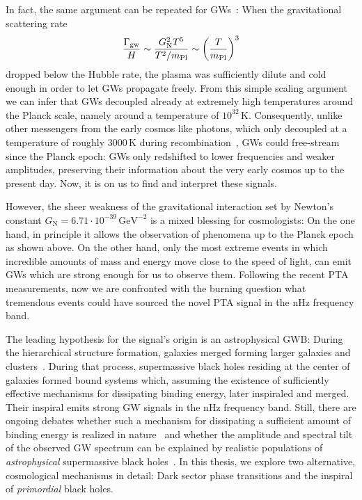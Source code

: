 In fact, the same argument can be repeated for \acp{GW}~\cite{Caprini:2018mtu, Maggiore:2007ulw}: When the gravitational scattering rate 
\begin{align}
	\frac{\Gamma_\text{gw}}{H} \sim \frac{G_\text{N}^2 T^5}{T^2 / m_\text{Pl}} \sim \left( \frac{T}{m_\text{Pl}} \right)^3
\end{align}
dropped below the Hubble rate, the plasma was sufficiently dilute and cold enough in order  to let \acp{GW} propagate freely. From this simple scaling argument we can infer that \acp{GW} decoupled already at extremely high temperatures around the Planck scale, namely around a temperature of $10^{32} \, \text{K}$. Consequently, unlike other messengers from the early cosmos like photons, which only decoupled at a temperature of roughly $3000 \, \text{K}$ during recombination~\cite{Baumann:2022mni}, \acp{GW} could free-stream since the Planck epoch: \acp{GW} only redshifted to lower frequencies and weaker amplitudes, preserving their information about the very early cosmos up to the present day. Now, it is on us to find and interpret these signals.

However, the sheer weakness of the gravitational interaction set by Newton’s constant $G_\mathrm{N} = 6.71 \cdot 10^{-39} \, \text{GeV}^{-2}$ is a mixed blessing for cosmologists: On the one hand, in principle it allows the observation of phenomena up to the Planck epoch as shown above. On the other  hand, only the most extreme events in which incredible amounts of mass and energy move close to the speed of light, can emit \acp{GW} which are strong enough for us to observe them. Following the recent \ac{PTA} measurements, now we are confronted with the burning question what tremendous events could have sourced the novel \ac{PTA} signal in the nHz frequency band.

The leading hypothesis for the signal's origin is an astrophysical \ac{GWB}: During the hierarchical structure formation, galaxies merged forming larger galaxies and clusters~\cite{NANOGrav:2023pdq}. During that process, supermassive black holes residing at the center of galaxies formed bound systems which, assuming the existence of sufficiently effective mechanisms for dissipating binding energy, later inspiraled and  merged. Their inspiral emits strong \ac{GW} signals in the nHz frequency band. Still, there are ongoing debates whether such a mechanism for dissipating a sufficient amount of binding energy is realized in nature~\cite{Binney:1987,  Ivanov:1998qk, Haiman:2009te, Amaro-Seoane:2009ucl,  Kocsis:2010xa, Vasiliev:2013az,Vasiliev:2013nha, Vasiliev:2015, Dosopoulou:2016hbg} and whether the amplitude and spectral tilt of the observed \ac{GW} spectrum can be explained by realistic populations of \textit{astrophysical} supermassive black holes~\cite{NANOGrav:2023pdq}. In this thesis, we explore two alternative, cosmological mechanisms in detail: Dark sector phase transitions and the inspiral of \textit{primordial} black holes. 

